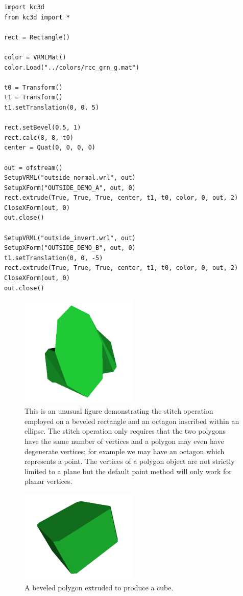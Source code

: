 \begin{verbatim}
import kc3d
from kc3d import *

rect = Rectangle()

color = VRMLMat()
color.Load("../colors/rcc_grn_g.mat")

t0 = Transform()
t1 = Transform()
t1.setTranslation(0, 0, 5)

rect.setBevel(0.5, 1)
rect.calc(8, 8, t0)
center = Quat(0, 0, 0, 0)

out = ofstream()
SetupVRML("outside_normal.wrl", out)
SetupXForm("OUTSIDE_DEMO_A", out, 0)
rect.extrude(True, True, True, center, t1, t0, color, 0, out, 2)
CloseXForm(out, 0)
out.close()

SetupVRML("outside_invert.wrl", out)
SetupXForm("OUTSIDE_DEMO_B", out, 0)
t1.setTranslation(0, 0, -5)
rect.extrude(True, True, True, center, t1, t0, color, 0, out, 2)
CloseXForm(out, 0)
out.close()
\end{verbatim}

\begin{figure}
\label{fig:k3dtools-weird}
\centering
\includegraphics[width = 0.5\textwidth]{img/k3dtools-weird.png}
\caption{This is an unusual figure demonstrating the stitch operation employed on a
beveled rectangle and an octagon inscribed within an ellipse. The stitch operation
only requires that the two polygons have the same number of vertices and a polygon may
even have degenerate vertices; for example we may have an octagon which represents a point.
The vertices of a polygon object are not strictly limited to a plane but the default
paint method will only work for planar vertices.}
\end{figure}

\begin{figure}
\label{fig:k3dtools-extrude}
\centering
\includegraphics[width = 0.5\textwidth]{img/k3dtools-extrude.png}
\caption{A beveled polygon extruded to produce a cube.}
\end{figure}

